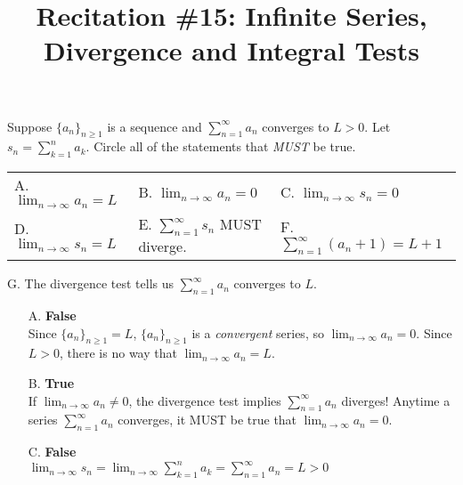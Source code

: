 \documentclass[noinstructornotes]{ximera}
\title{Recitation \#15: Infinite Series, Divergence and Integral Tests}
\begin{document}
\begin{abstract}		\end{abstract}
\maketitle

\begin{problem}
Suppose $\displaystyle\{a_n\}_{n \geq 1}$ is a sequence and $\displaystyle \sum^{\infty}_{n= 1} a_n$ converges to $L>0$.  Let $s_n =\displaystyle  \sum^n_{k=1} a_k$.  Circle all of the statements that \emph{MUST} be true. 

\begin{tabular}{lll}
A. $\displaystyle \lim_{n \rightarrow \infty} a_n = L$ \qquad  \qquad  & B. $\displaystyle \lim_{n \rightarrow \infty} a_n = 0$ \qquad  \qquad  & C. $\displaystyle \lim_{n \rightarrow \infty} s_n = 0$   \\ [5ex] 
D. $\displaystyle \lim_{n \rightarrow \infty} s_n = L$ \qquad   \qquad  &E.  $\displaystyle \sum^{\infty}_{n=1} s_n$ MUST diverge. \qquad  \qquad  &F. $\displaystyle \sum^{\infty}_{n=1} (a_n+1) = L+1$ \\
\end{tabular}

\hspace{.5mm} G. The divergence test tells us $\displaystyle \sum^{\infty}_{n= 1} a_n$ converges to $L$.


\begin{freeResponse}

\begin{itemize}
\item[A.] \textbf{False} \\ Since $\displaystyle\{a_n\}_{n \geq 1} = L$, $\displaystyle\{a_n\}_{n \geq 1}$ is a \emph{convergent} series, so $\displaystyle \lim_{n \rightarrow \infty} a_n = 0$.  Since $L>0$, there is no way that $\displaystyle \lim_{n \rightarrow \infty} a_n = L$.


\item[B.] \textbf{True} \\ If $\displaystyle \lim_{n \rightarrow \infty} a_n \neq 0$, the divergence test implies $\displaystyle \sum^{\infty}_{n= 1} a_n$ diverges!  Anytime a series $\displaystyle \sum^{\infty}_{n= 1} a_n$ converges, it MUST be true that $\displaystyle \lim_{n \rightarrow \infty} a_n = 0$. 

\item[C.] \textbf{False} \\ $\displaystyle \lim_{n \rightarrow \infty} s_n = \lim_{n \rightarrow \infty} \displaystyle  \sum^n_{k=1} a_k = \displaystyle \sum^{\infty}_{n= 1} a_n = L>0 $ 


\end{itemize}
\end{freeResponse}
\end{problem}
\end{document}
